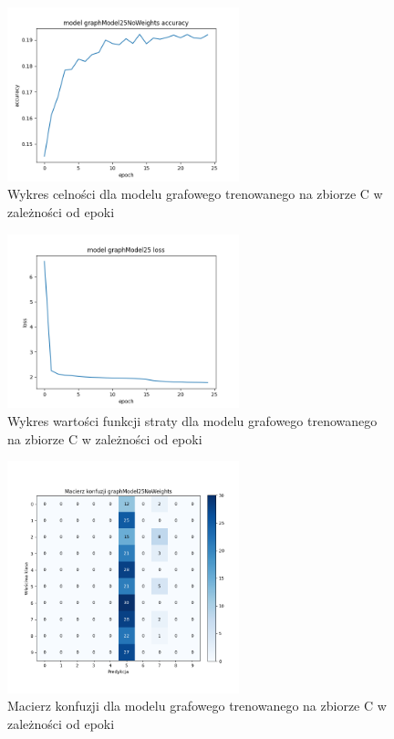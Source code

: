 \documentclass{article}
\begin{document}
\begin{figure}[H]
    \centering
    \includegraphics[width=0.6\textwidth]{../Saves/Graph/graphModel25NoWeights_acc.png}
    \caption{Wykres celności dla modelu grafowego trenowanego na zbiorze C w zależności od epoki} 
\end{figure}

\begin{figure}[H]
    \centering
    \includegraphics[width=0.6\textwidth]{../Saves/Graph/graphModel25_loss.png}
    \caption{Wykres wartości funkcji straty dla modelu grafowego trenowanego na zbiorze C w zależności od epoki} 
\end{figure}

\begin{figure}[H]
    \centering
    \includegraphics[width=0.6\textwidth]{../Saves/Graph/graphModel25NoWeights_confusion.png}
    \caption{Macierz konfuzji dla modelu grafowego trenowanego na zbiorze C w zależności od epoki} 
\end{figure}
\end{document}
